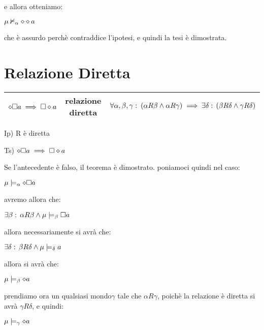 e allora otteniamo:

$\mu\nvDash_{\alpha}\diamond\diamond a$

che è assurdo perchè contraddice l'ipotesi, e quindi la tesi è dimostrata.

\begin{center} 
\end{center}


\section{Relazione Diretta}

\begin{tabular}{|c|c|c|}
\hline 
$\diamond\square a\implies\square\diamond a$  & relazione diretta  & $\forall\alpha,\beta,\gamma:\:(\alpha R\beta\wedge\alpha R\gamma)\implies\exists\delta:\,(\beta R\delta\wedge\gamma R\delta)$\tabularnewline
\hline 
\end{tabular}

Ip) R è diretta

Ts) $\diamond\square a\implies\square\diamond a$ 

Se l'antecedente è falso, il teorema è dimostrato. poniamoci quindi
nel caso:

$\mu\models_{\alpha}\diamond\square a$

avremo allora che:

$\exists\beta:\,\alpha R\beta\wedge\mu\models_{\beta}\square a$

allora necessariamente si avrà che:

$\exists\delta:\,\beta R\delta\wedge\mu\models_{\delta}a$

allora si avrà che:

$\mu\models_{\beta}\diamond a$

prendiamo ora un qualsiasi mondo$\gamma$ tale che $\alpha R\gamma$,
poichè la relazione è diretta si avrà $\gamma R\delta$, e quindi:

$\mu\models_{\gamma}\diamond a$

